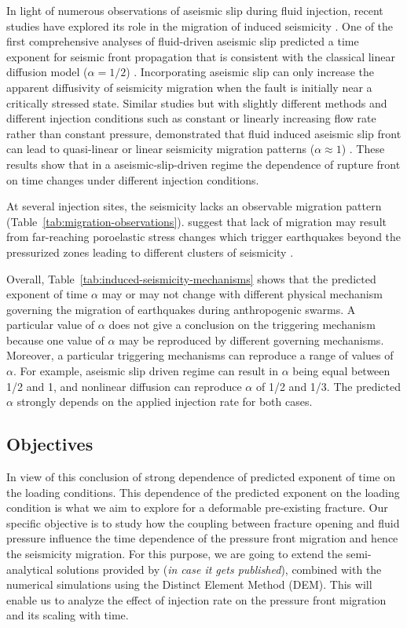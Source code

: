 \documentclass[draft]{agujournal2019}
\begin{document}
In light of numerous observations of aseismic slip during fluid injection, recent studies have explored its role in the migration of induced seismicity \cite{GuglielmiEtAl2015b, BhattacharyaViesca2019, DeBarrosEtAl2021}. One of the first comprehensive analyses of fluid-driven aseismic slip predicted a time exponent for seismic front propagation that is consistent with the classical linear diffusion model ($\alpha = 1/2$) \cite{BhattacharyaViesca2019}. Incorporating aseismic slip can only increase the apparent diffusivity of seismicity migration when the fault is initially near a critically stressed state. Similar studies but with slightly different methods and different injection conditions such as constant or linearly increasing flow rate rather than constant pressure, demonstrated that fluid induced aseismic slip front can lead to quasi-linear or linear seismicity migration patterns ($\alpha \approx 1$) \cite{DeBarrosEtAl2021, SaezUribe2023, DanreEtAl2024}. These results show that in a aseismic-slip-driven regime the dependence of rupture front on time changes under different injection conditions.

At several injection sites, the seismicity lacks an observable migration pattern (Table~\ref{tab:migration-observations}).  suggest that lack of migration may result from far-reaching poroelastic stress changes which trigger earthquakes beyond the pressurized zones leading to different clusters of seismicity \cite{GoebelEtAl2017}.

Overall, Table~\ref{tab:induced-seismicity-mechanisms} shows that the predicted exponent of time $\alpha$ may or may not change with different physical mechanism governing the migration of earthquakes during anthropogenic swarms. A particular value of $\alpha$ does not give a conclusion on the triggering mechanism because one value of $\alpha$ may be reproduced by different governing mechanisms. Moreover, a particular triggering mechanisms can reproduce a range of values of $\alpha$. For example, aseismic slip driven regime can result in $\alpha$ being equal between 1/2 and 1, and nonlinear diffusion can reproduce $\alpha$ of 1/2 and 1/3. The predicted $\alpha$ strongly depends on the applied injection rate for both cases.

\subsection{Objectives}

In view of this conclusion of strong dependence of predicted exponent of time on the loading conditions. This dependence of the predicted exponent on the loading condition is what we aim to explore for a deformable pre-existing fracture. Our specific objective is to study how the coupling between fracture opening and fluid pressure influence the time dependence of the pressure front migration and hence the seismicity migration. For this purpose, we are going to extend the semi-analytical solutions provided by  (\textit{in case it gets published}), combined with the numerical simulations using the Distinct Element Method (DEM). This will enable us to analyze the effect of injection rate on the pressure front migration and its scaling with time.
\end{document}
